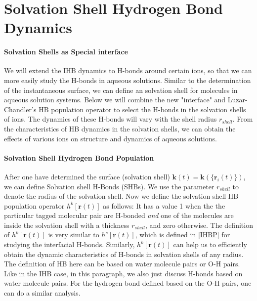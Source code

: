 \section{Solvation Shell Hydrogen Bond Dynamics} \label{SHB_dynamics}
\paragraph{Solvation Shells as Special interface}
We will extend the IHB dynamics to H-bonds around certain ions, so that we can more easily study the H-bonds in aqueous solutions. 
Similar to the determination of the instantaneous surface, we can define an solvation shell for molecules in aqueous solution systems. 
Below we will combine the new "interface" and Luzar-Chandler's HB population operator \cite{AL96} to select the H-bonds 
in the solvation shells of ions. The dynamics of these H-bonds will vary with the shell radius $r_{shell}$.
From the characteristics of HB dynamics in the solvation shells, we can obtain the effects of various ions on structure and dynamics of aqueous solutions. 

\paragraph{Solvation Shell Hydrogen Bond Population}
After one have determined the surface (solvation shell) ${\mathbf k}(t)={\mathbf k}(\{{\mathbf r}_i(t)\})$, we can define Solvation shell H-Bonds (SHBs).
We use the parameter $r_{shell}$ to denote the radius of the solvation shell.
Now we define the solvation shell HB population operator $h^{k}[{\mathbf r}(t)]$ as follows:
It has a value 1 when the the particular tagged molecular pair are H-bonded \emph{and} one of the molecules are inside the solvation shell
with a thickness $r_{shell}$, and zero otherwise. 
The definition of  $h^{k}[{\mathbf r}(t)]$ is very similar to $h^{s}[{\mathbf r}(t)]$, which is defined in \ref{IHBP} for studying the interfacial H-bonds.
Similarly, $h^{k}[{\mathbf r}(t)]$ can help us to efficiently obtain the dynamic characteristics of H-bonds in solvation shells of any radius. 
The definition of HB here can be based on water molecule pairs or O-H pairs. 
Like in the IHB case, in this paragraph, we also just discuss H-bonds based on water molecule pairs. 
For the hydrogen bond defined based on the O-H pairs, one can do a similar analysis.

